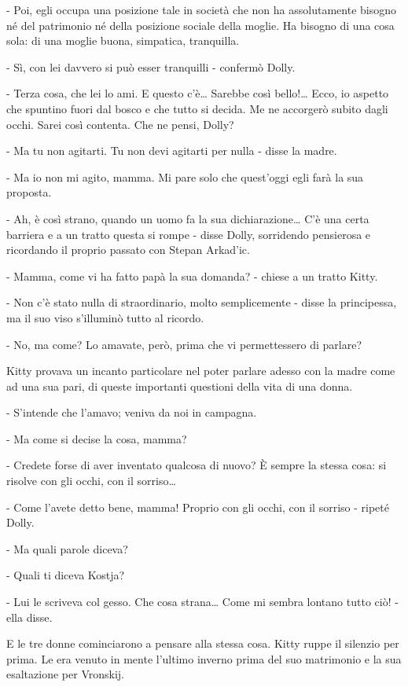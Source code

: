 - Poi, egli occupa una posizione tale in società che non ha assolutamente bisogno né del patrimonio né della posizione sociale della moglie. Ha bisogno di una cosa sola: di una moglie buona, simpatica, tranquilla. 

- Sì, con lei davvero si può esser tranquilli - confermò Dolly. 

- Terza cosa, che lei lo ami. E questo c'è\ldots{} Sarebbe così bello!\ldots{} Ecco, io aspetto che spuntino fuori dal bosco e che tutto si decida. Me ne accorgerò subito dagli occhi. Sarei così contenta. Che ne pensi, Dolly? 

- Ma tu non agitarti. Tu non devi agitarti per nulla - disse la madre. 

- Ma io non mi agito, mamma. Mi pare solo che quest'oggi egli farà la sua proposta. 

- Ah, è così strano, quando un uomo fa la sua dichiarazione\ldots{} C'è una certa barriera e a un tratto questa si rompe - disse Dolly, sorridendo pensierosa e ricordando il proprio passato con Stepan Arkad'ic. 

- Mamma, come vi ha fatto papà la sua domanda? - chiese a un tratto Kitty. 

- Non c'è stato nulla di straordinario, molto semplicemente - disse la principessa, ma il suo viso s'illuminò tutto al ricordo. 

- No, ma come? Lo amavate, però, prima che vi permettessero di parlare? 

Kitty provava un incanto particolare nel poter parlare adesso con la madre come ad una sua pari, di queste importanti questioni della vita di una donna. 

- S'intende che l'amavo; veniva da noi in campagna. 

- Ma come si decise la cosa, mamma? 

- Credete forse di aver inventato qualcosa di nuovo? È sempre la stessa cosa: si risolve con gli occhi, con il sorriso\ldots{} 

- Come l'avete detto bene, mamma! Proprio con gli occhi, con il sorriso - ripeté Dolly. 

- Ma quali parole diceva? 

- Quali ti diceva Kostja? 

- Lui le scriveva col gesso. Che cosa strana\ldots{} Come mi sembra lontano tutto ciò! - ella disse. 

E le tre donne cominciarono a pensare alla stessa cosa. Kitty ruppe il silenzio per prima. Le era venuto in mente l'ultimo inverno prima del suo matrimonio e la sua esaltazione per Vronskij. 

